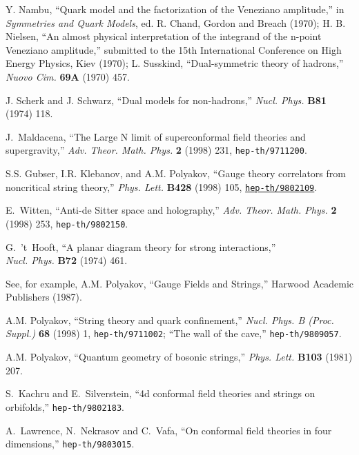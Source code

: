 \documentclass[12pt]{article}
\begin{document}
\begin{thebibliography}{99}
\baselineskip=14.5pt
\frenchspacing

Y. Nambu, ``Quark model and the factorization of the Veneziano amplitude,''
in {\em Symmetries and Quark Models}, ed. R. Chand, Gordon and Breach
(1970);
H. B. Nielsen, ``An almost physical interpretation of the integrand
of the n-point Veneziano amplitude,'' submitted to the 15th
International Conference on High Energy Physics, Kiev (1970);
L. Susskind, ``Dual-symmetric theory of hadrons,''
{\em Nuovo Cim.} {\bf 69A} (1970) 457.

J. Scherk and J. Schwarz, ``Dual models for non-hadrons,''
{\em Nucl. Phys.} {\bf B81} (1974) 118.

J.~Maldacena, ``The Large N limit of superconformal field theories and
supergravity,'' {\em Adv. Theor. Math. Phys.} {\bf 2} (1998) 231, 
{{\tt hep-th/9711200}}.

S.S. Gubser, I.R. Klebanov, and A.M. Polyakov, ``Gauge theory correlators
  from noncritical string theory,''
{\em Phys. Lett.} {\bf B428} (1998) 105,
  \href{http://xxx.lanl.gov/abs/hep-th/9802109}{{\tt hep-th/9802109}}.

E.~Witten, ``Anti-de Sitter space and holography,''
{\em Adv. Theor. Math. Phys.} {\bf 2} (1998) 253,
{{\tt hep-th/9802150}}.

G.~'t~Hooft, ``A planar diagram theory for strong interactions,'' \\ 
{\em Nucl. Phys.} {\bf B72} (1974) 461.

See, for example,
A.M. Polyakov, ``Gauge Fields and Strings,'' Harwood Academic Publishers
(1987).

A.M. Polyakov, ``String theory and quark confinement,''
{\it Nucl. Phys. B (Proc. Suppl.)} {\bf 68} (1998) 1, {{\tt hep-th/9711002}};
``The wall of the cave,'' {{\tt hep-th/9809057}}.

A.M. Polyakov, ``Quantum geometry of bosonic strings,'' 
{\em Phys. Lett.} {\bf B103} (1981) 207.

S.~Kachru and E.~Silverstein, ``4d conformal field theories and
strings on orbifolds,''
{{\tt hep-th/9802183}}.

A.~Lawrence, N.~Nekrasov and C.~Vafa, ``On conformal field theories
in four dimensions,''
{{\tt hep-th/9803015}}.


\end{thebibliography}
\end{document}
